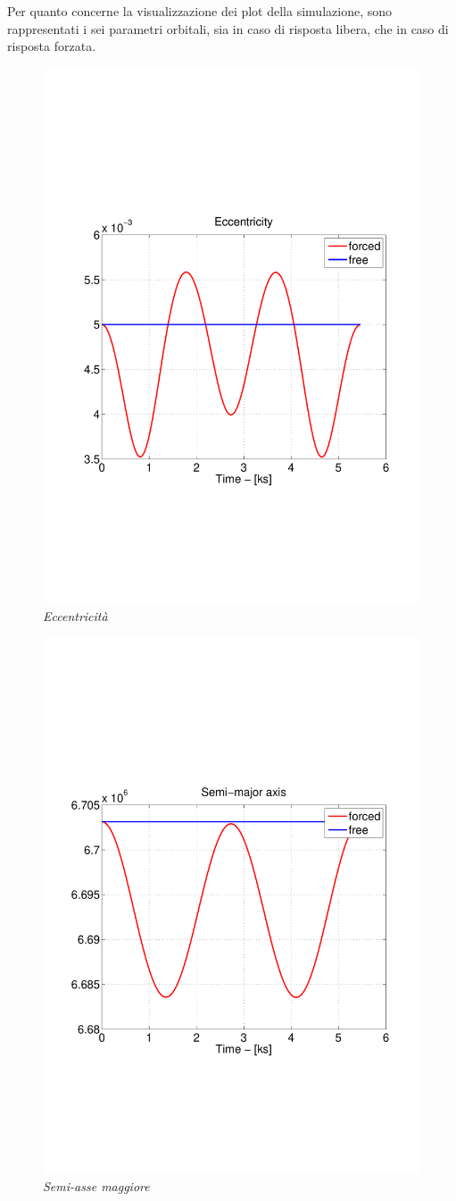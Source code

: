 Per quanto concerne la visualizzazione dei plot della simulazione, sono
rappresentati i sei parametri orbitali, sia in caso di risposta libera, che in
caso di risposta forzata.

\begin{figure}
	\includegraphics[width=.6\textwidth,clip=true,trim=1cm
	6cm
	1cm
	8cm]{modelling/orbit_dynamics/image/eccentricity.pdf}
	\caption{\emph{Eccentricità}}
\end{figure}

\begin{figure}
	\includegraphics[width=.6\textwidth,clip=true,trim=1cm
	6cm
	1cm
	8cm]{modelling/orbit_dynamics/image/semi-major_axis.pdf}
	\caption{\emph{Semi-asse maggiore}}
\end{figure}

